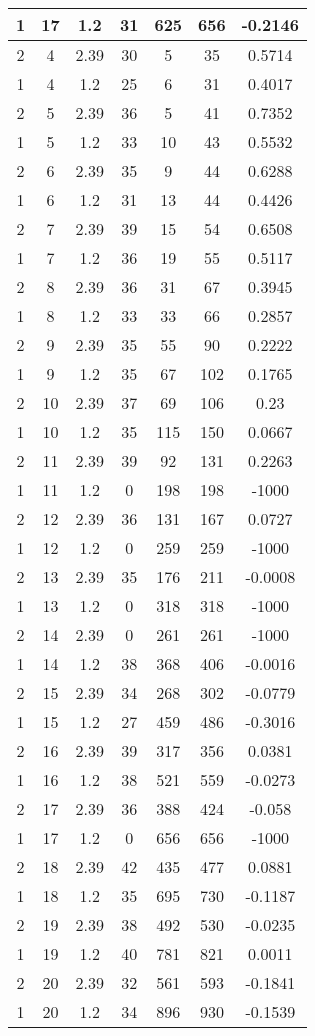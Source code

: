 \documentclass[letterpaper, 12pt]{article}
\begin{document}
\begin{longtable}{|c|c|c|c|c|c|c|}
\hline
1 & 17 & 1.2 & 31 & 625 & 656 & -0.2146 \\
\hline
2 & 4 & 2.39 & 30 & 5 & 35 & 0.5714 \\
\hline
1 & 4 & 1.2 & 25 & 6 & 31 & 0.4017 \\
\hline
2 & 5 & 2.39 & 36 & 5 & 41 & 0.7352 \\
\hline
1 & 5 & 1.2 & 33 & 10 & 43 & 0.5532 \\
\hline
2 & 6 & 2.39 & 35 & 9 & 44 & 0.6288 \\
\hline
1 & 6 & 1.2 & 31 & 13 & 44 & 0.4426 \\
\hline
2 & 7 & 2.39 & 39 & 15 & 54 & 0.6508 \\
\hline
1 & 7 & 1.2 & 36 & 19 & 55 & 0.5117 \\
\hline
2 & 8 & 2.39 & 36 & 31 & 67 & 0.3945 \\
\hline
1 & 8 & 1.2 & 33 & 33 & 66 & 0.2857 \\
\hline
2 & 9 & 2.39 & 35 & 55 & 90 & 0.2222 \\
\hline
1 & 9 & 1.2 & 35 & 67 & 102 & 0.1765 \\
\hline
2 & 10 & 2.39 & 37 & 69 & 106 & 0.23 \\
\hline
1 & 10 & 1.2 & 35 & 115 & 150 & 0.0667 \\
\hline
2 & 11 & 2.39 & 39 & 92 & 131 & 0.2263 \\
\hline
1 & 11 & 1.2 & 0 & 198 & 198 & -1000 \\
\hline
2 & 12 & 2.39 & 36 & 131 & 167 & 0.0727 \\
\hline
1 & 12 & 1.2 & 0 & 259 & 259 & -1000 \\
\hline
2 & 13 & 2.39 & 35 & 176 & 211 & -0.0008 \\
\hline
1 & 13 & 1.2 & 0 & 318 & 318 & -1000 \\
\hline
2 & 14 & 2.39 & 0 & 261 & 261 & -1000 \\
\hline
1 & 14 & 1.2 & 38 & 368 & 406 & -0.0016 \\
\hline
2 & 15 & 2.39 & 34 & 268 & 302 & -0.0779 \\
\hline
1 & 15 & 1.2 & 27 & 459 & 486 & -0.3016 \\
\hline
2 & 16 & 2.39 & 39 & 317 & 356 & 0.0381 \\
\hline
1 & 16 & 1.2 & 38 & 521 & 559 & -0.0273 \\
\hline
2 & 17 & 2.39 & 36 & 388 & 424 & -0.058 \\
\hline
1 & 17 & 1.2 & 0 & 656 & 656 & -1000 \\
\hline
2 & 18 & 2.39 & 42 & 435 & 477 & 0.0881 \\
\hline
1 & 18 & 1.2 & 35 & 695 & 730 & -0.1187 \\
\hline
2 & 19 & 2.39 & 38 & 492 & 530 & -0.0235 \\
\hline
1 & 19 & 1.2 & 40 & 781 & 821 & 0.0011 \\
\hline
2 & 20 & 2.39 & 32 & 561 & 593 & -0.1841 \\
\hline
1 & 20 & 1.2 & 34 & 896 & 930 & -0.1539 \\
\hline
\end{longtable}
\end{document}
